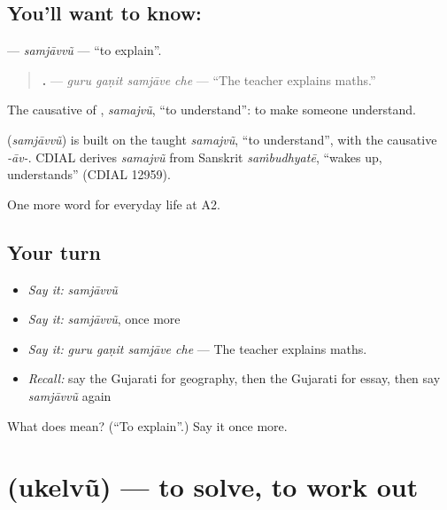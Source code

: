 \subsection*{You'll want to know: }
\textbf{} — \emph{samjāvvũ} — \textquotedblleft{}to explain\textquotedblright{}.

\begin{quote}
\textbf{   .} — \emph{guru gaṇit samjāve che} — \textquotedblleft{}The teacher explains maths.\textquotedblright{}
\end{quote}

The causative of \textbf{}, \emph{samajvũ}, \textquotedblleft{}to understand\textquotedblright{}: to make someone understand.

\begin{cousinweb}
\textbf{} (\emph{samjāvvũ}) is built on the taught \emph{samajvũ}, \textquotedblleft{}to understand\textquotedblright{}, with the causative \emph{-āv-}. CDIAL derives \emph{samajvũ} from Sanskrit \emph{saṁbudhyatē}, \textquotedblleft{}wakes up, understands\textquotedblright{} (CDIAL 12959).
\end{cousinweb}

\begin{grammarlens}[title={What you've built}]
One more word for everyday life at A2.
\end{grammarlens}

\subsection*{Your turn}
\begin{itemize}
\raggedright
  \item \emph{Say it:} \emph{samjāvvũ}
  \item \emph{Say it:} \emph{samjāvvũ}, once more
  \item \emph{Say it:} \emph{guru gaṇit samjāve che} — The teacher explains maths.
  \item \emph{Recall:} say the Gujarati for geography, then the Gujarati for essay, then say \emph{samjāvvũ} again
\end{itemize}

\begin{tcolorbox}[breakable,colback=teal!4,colframe=teal!35!black,title={Before you move on}]
What does  mean? (\textquotedblleft{}To explain\textquotedblright{}.) Say it once more.
\end{tcolorbox}
\section[\texorpdfstring{\gu{ઉકેલવું} (ukelvũ)}{ઉકેલવું (ukelvũ)}]{ (ukelvũ) — to solve, to work out}

